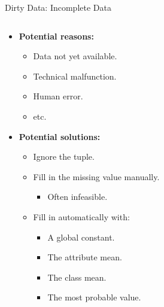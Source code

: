 \begin{frame}{Dirty Data: Incomplete Data}
	\begin{columns}
		\begin{column}{0.45\textwidth}
			\begin{itemize}
				\item \textbf{Potential reasons:}
				      \begin{itemize}
					      \item Data not yet available.
					      \item Technical malfunction.
					      \item Human error.
					      \item etc.
				      \end{itemize}
				\item \textbf{Potential solutions:}
				      \begin{itemize}
					      \item Ignore the tuple.
					      \item Fill in the missing value manually.
					            \begin{itemize}
						            \item Often infeasible.
					            \end{itemize}
					      \item Fill in automatically with:
					            \begin{itemize}
						            \item A global constant.
						            \item The attribute mean.
						            \item The class mean.
						            \item The most probable value.
					            \end{itemize}
				      \end{itemize}
			\end{itemize}
		\end{column}

		\begin{column}{0.45\textwidth}
			\centering

			\vspace*{1cm}


\end{column}
\end{columns}
\end{frame}
